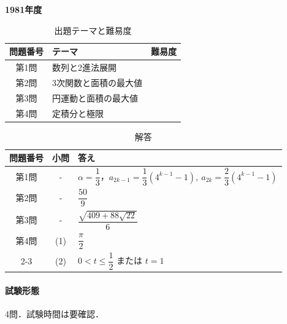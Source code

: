 \documentclass[../../main.tex]{subfiles}
\begin{document}
\begin{center}
  {\fontsize{48pt}{58pt}\selectfont \textbf{1981}\normalsize\textbf{年度}}
\end{center}

\begin{table}[htb]
  \centering
  \caption{出題テーマと難易度}
  \begin{tabular}{|c|p{9cm}|c|}
    \hline
    \textbf{問題番号} & \textbf{テーマ} & \textbf{難易度} \\
    \hline
    第1問 & 数列と2進法展開 & \\
    \hline
    第2問 & 3次関数と面積の最大値 & \\
    \hline
    第3問 & 円運動と面積の最大値 & \\
    \hline
    第4問 & 定積分と極限 & \\
    \hline
  \end{tabular}
\end{table}

\begin{table}[htb]
  \centering
  \caption{解答}
  \renewcommand{\arraystretch}{1.4}
  \begin{tabular}{|c|c|p{9cm}|}
    \hline
    \textbf{問題番号} & \textbf{小問} & \textbf{答え} \\
    \hline
    第1問 & - & $\alpha=\dfrac{1}{3}$，$a_{2k-1}=\dfrac{1}{3}(4^{k-1}-1),\ a_{2k}=\dfrac{2}{3}(4^{k-1}-1)$ \\
    \hline
    第2問 & - & $\dfrac{50}{9}$ \\
    \hline
    第3問 & - & $\dfrac{\sqrt{409+88\sqrt{22}}}{6}$ \\
    \hline
    第4問 & (1) & $\dfrac{\pi}{2}$ \\
    \cline{2-3}
    & (2) & $0<t\le\dfrac{1}{2}$ または $t=1$ \\
    \hline
  \end{tabular}
\end{table}

\paragraph{試験形態}
4問．試験時間は要確認．
\end{document}
